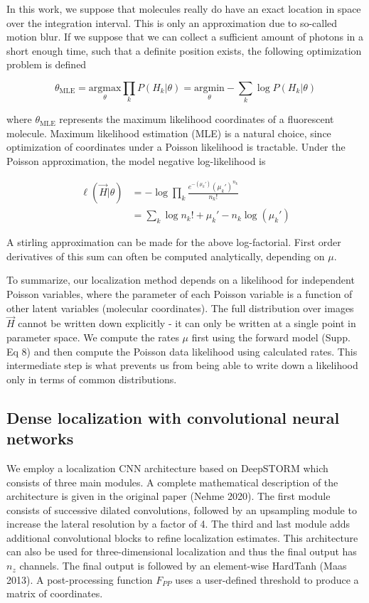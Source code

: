 \documentclass{ucetd}
\begin{document}
In this work, we suppose that molecules really do have an exact location in space over the integration interval. This is only an approximation due to so-called motion blur. If we suppose that we can collect a sufficient amount of photons in a short enough time, such that a definite position exists, the following optimization problem is defined

\begin{equation*}
\theta_{\mathrm{MLE}} = \underset{\theta}{\mathrm{argmax}}\prod_{k}P(H_{k}|\theta)= \underset{\theta}{\mathrm{argmin}}-\sum_{k}\log P(H_{k}|\theta)
\end{equation*}


where $\theta_{\mathrm{MLE}}$ represents the maximum likelihood coordinates of a fluorescent molecule. Maximum likelihood estimation (MLE) is a natural choice, since optimization of coordinates under a Poisson likelihood is tractable. Under the Poisson approximation, the model negative log-likelihood is

\begin{align}
\ell(\vec{H}|\theta) &= -\log \prod_{k} \frac{e^{-\left(\mu_{k}'\right)}\left(\mu_{k}'\right)^{n_{k}}}{n_{k}!}\\
&= \sum_{k}  \log n_{k}! + \mu_{k}' - n_{k}\log\left(\mu_{k}'\right)
\end{align}

A stirling approximation can be made for the above log-factorial. First order derivatives of this sum can often be computed analytically, depending on $\mu$. 

To summarize, our localization method depends on a likelihood for independent Poisson variables, where the parameter of each Poisson variable is a function of other latent variables (molecular coordinates). The full distribution over images $\vec{H}$ cannot be written down explicitly - it can only be written at a single point in parameter space. We compute the rates $\mu$ first using the forward model (Supp. Eq 8) and then compute the Poisson data likelihood using calculated rates. This intermediate step is what prevents us from being able to write down a likelihood only in terms of common distributions.

\subsection{Dense localization with convolutional neural networks}

We employ a localization CNN architecture based on DeepSTORM which consists of three main modules. A complete mathematical description of the architecture is given in the original paper (Nehme 2020). The first module consists of successive dilated convolutions, followed by an upsampling module to increase the lateral resolution by a factor of 4. The third and last module adds additional convolutional blocks to refine localization estimates. This architecture can also be used for three-dimensional localization and thus the final output has $n_{z}$ channels. The final output is followed by an element-wise HardTanh (Maas 2013). A post-processing function $F_{PP}$ uses a user-defined threshold to produce a matrix of coordinates. 
\end{document}
